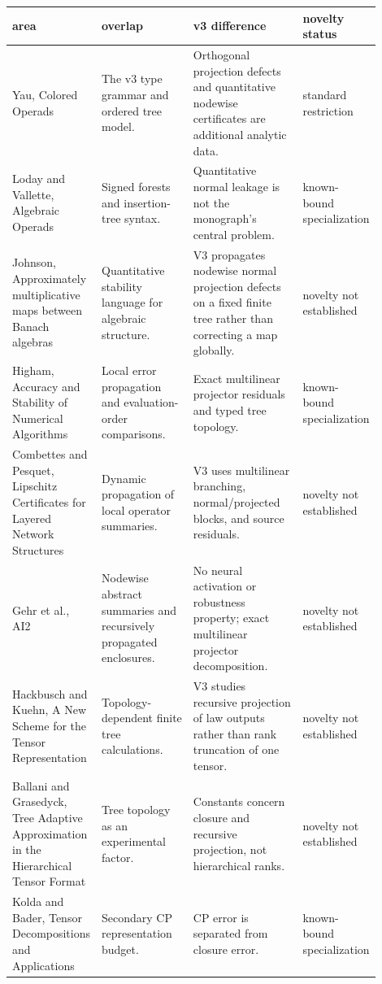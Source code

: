 \begin{tabular}{@{}>{\raggedright\arraybackslash}p{0.17\linewidth}>{\raggedright\arraybackslash}p{0.26\linewidth}>{\raggedright\arraybackslash}p{0.31\linewidth}>{\raggedright\arraybackslash}p{0.16\linewidth}@{}}
\toprule
area & overlap & v3 difference & novelty status \\
\midrule
Yau, Colored Operads & The v3 type grammar and ordered tree model. & Orthogonal projection defects and quantitative nodewise certificates are additional analytic data. & standard restriction \\
Loday and Vallette, Algebraic Operads & Signed forests and insertion-tree syntax. & Quantitative normal leakage is not the monograph's central problem. & known-bound specialization \\
Johnson, Approximately multiplicative maps between Banach algebras & Quantitative stability language for algebraic structure. & V3 propagates nodewise normal projection defects on a fixed finite tree rather than correcting a map globally. & novelty not established \\
Higham, Accuracy and Stability of Numerical Algorithms & Local error propagation and evaluation-order comparisons. & Exact multilinear projector residuals and typed tree topology. & known-bound specialization \\
Combettes and Pesquet, Lipschitz Certificates for Layered Network Structures & Dynamic propagation of local operator summaries. & V3 uses multilinear branching, normal/projected blocks, and source residuals. & novelty not established \\
Gehr et al., AI2 & Nodewise abstract summaries and recursively propagated enclosures. & No neural activation or robustness property; exact multilinear projector decomposition. & novelty not established \\
Hackbusch and Kuehn, A New Scheme for the Tensor Representation & Topology-dependent finite tree calculations. & V3 studies recursive projection of law outputs rather than rank truncation of one tensor. & novelty not established \\
Ballani and Grasedyck, Tree Adaptive Approximation in the Hierarchical Tensor Format & Tree topology as an experimental factor. & Constants concern closure and recursive projection, not hierarchical ranks. & novelty not established \\
Kolda and Bader, Tensor Decompositions and Applications & Secondary CP representation budget. & CP error is separated from closure error. & known-bound specialization \\

\end{tabular}
